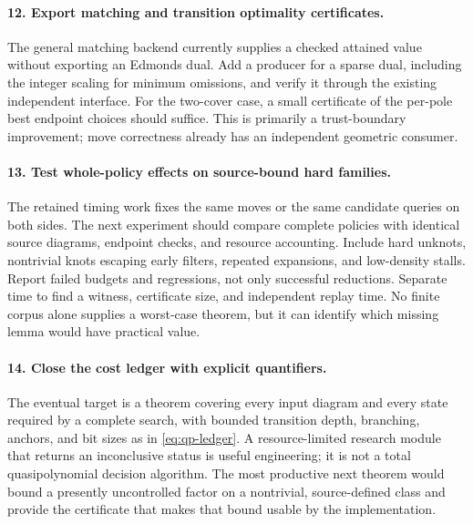 \paragraph{12. Export matching and transition optimality certificates.}
The general matching backend currently supplies a checked attained value
without exporting an Edmonds dual. Add a producer for a sparse dual,
including the integer scaling for minimum omissions, and verify it through
the existing independent interface. For the two-cover case, a small
certificate of the per-pole best endpoint choices should suffice. This is
primarily a trust-boundary improvement; move correctness already has an
independent geometric consumer.

\paragraph{13. Test whole-policy effects on source-bound hard families.}
The retained timing work fixes the same moves or the same candidate queries
on both sides. The next experiment should compare complete policies with
identical source diagrams, endpoint checks, and resource accounting. Include
hard unknots, nontrivial knots escaping early filters, repeated expansions,
and low-density stalls. Report failed budgets and regressions, not only
successful reductions. Separate time to find a witness, certificate size,
and independent replay time. No finite corpus alone supplies a worst-case
theorem, but it can identify which missing lemma would have practical value.

\paragraph{14. Close the cost ledger with explicit quantifiers.}
The eventual target is a theorem covering every input diagram and every
state required by a complete search, with bounded transition depth,
branching, anchors, and bit sizes as in \eqref{eq:qp-ledger}. A resource-limited
research module that returns an inconclusive status is useful engineering;
it is not a total quasipolynomial decision algorithm. The most productive
next theorem would bound a presently uncontrolled factor on a nontrivial,
source-defined class and provide the certificate that makes that bound
usable by the implementation.

